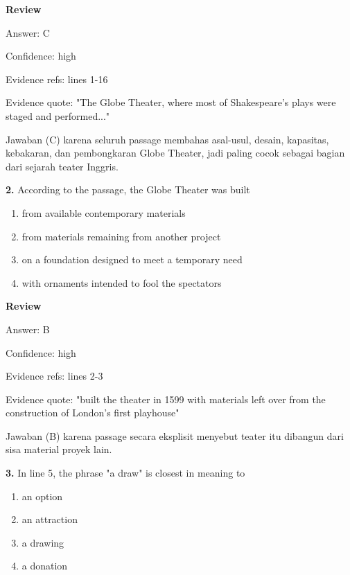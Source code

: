 \documentclass[12pt]{article}
\begin{document}
\par
\begingroup
\setlength{\parskip}{0pt}
\setlength{\parindent}{0pt}
\textbf{Review}\par
Answer: C\par
Confidence: high\par
Evidence refs: lines 1-16\par
Evidence quote: "The Globe Theater, where most of Shakespeare's plays were staged and performed..."\par
Jawaban (C) karena seluruh passage membahas asal-usul, desain, kapasitas, kebakaran, dan pembongkaran Globe Theater, jadi paling cocok sebagai bagian dari sejarah teater Inggris.\par
\endgroup
\par
\vspace{0.25\baselineskip}
\noindent\textbf{2.} According to the passage, the Globe Theater was built
\begin{enumerate}[label=(\Alph*),leftmargin=*,itemsep=0.2em]
\item from available contemporary materials
\item from materials remaining from another project
\item on a foundation designed to meet a temporary need
\item with ornaments intended to fool the spectators
\end{enumerate}
\par
\begingroup
\setlength{\parskip}{0pt}
\setlength{\parindent}{0pt}
\textbf{Review}\par
Answer: B\par
Confidence: high\par
Evidence refs: lines 2-3\par
Evidence quote: "built the theater in 1599 with materials left over from the construction of London's first playhouse"\par
Jawaban (B) karena passage secara eksplisit menyebut teater itu dibangun dari sisa material proyek lain.\par
\endgroup
\par
\vspace{0.25\baselineskip}
\noindent\textbf{3.} In line 5, the phrase "a draw" is closest in meaning to
\begin{enumerate}[label=(\Alph*),leftmargin=*,itemsep=0.2em]
\item an option
\item an attraction
\item a drawing
\item a donation
\end{enumerate}
\end{document}
